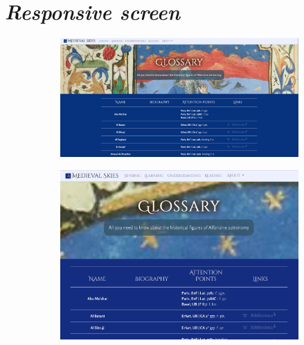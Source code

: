 	\chapter{\label{ResponsiveScreen}\textit{Responsive screen}}
	
	\begin{figure}[!h]
    \centering
    \begin{subfigure}[h]{0.8\textwidth}
        \includegraphics[width=\textwidth]{images/annexes/glossary-ordinateur.png}
    \end{subfigure}
    \begin{subfigure}[h]{0.6\textwidth}
        \includegraphics[width=\textwidth]{images/annexes/glossary-tablette.PNG}
    \end{subfigure}
    \begin{subfigure}[h]{0.3\textwidth}

\end{subfigure}
\end{figure}
